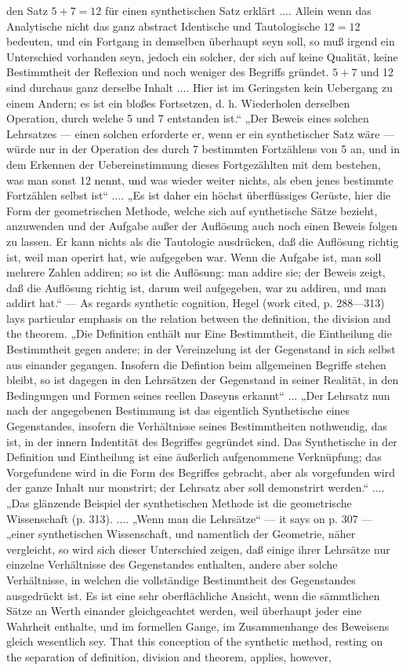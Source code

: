 \documentclass[12pt,a4paper,openany]{book}
\begin{document}
den Satz $5+7=12$ für einen synthetischen Satz erklärt .... Allein wenn das Analytische nicht das ganz abstract Identische und Tautologische $12=12$ bedeuten, und ein Fortgang in demselben überhaupt seyn soll, so muß irgend ein Unterschied vorhanden seyn, jedoch ein solcher, der sich auf keine Qualität, keine Bestimmtheit der Reflexion und noch weniger des Begriffs gründet. $5+7$ und 12 sind durchaus ganz derselbe Inhalt .... Hier ist im Geringsten kein Uebergang zu einem Andern; es ist ein bloßes Fortsetzen, d. h. Wiederholen derselben Operation, durch welche 5 und 7 entstanden ist.“ „Der Beweis eines solchen Lehrsatzes — einen solchen erforderte er, wenn er ein synthetischer Satz wäre — würde nur in der Operation des durch 7 bestimmten Fortzählens von 5 an, und in dem Erkennen der Uebereinstimmung dieses Fortgezählten mit dem bestehen, was man sonst 12 nennt, und was wieder weiter nichts, als eben jenes bestimmte Fortzählen selbst ist“ .... „Es ist daher ein höchst überflüssiges Gerüste, hier die Form der geometrischen Methode, welche sich auf synthetische Sätze bezieht, anzuwenden und der Aufgabe außer der Auflösung auch noch einen Beweis folgen zu lassen. Er kann nichts als die Tautologie ausdrücken, daß die Auflösung richtig ist, weil man operirt hat, wie aufgegeben war. Wenn die Aufgabe ist, man soll mehrere Zahlen addiren; so ist die Auflösung: man addire sie; der Beweis zeigt, daß die Auflösung richtig ist, darum weil aufgegeben, war zu addiren, und man addirt hat.“ — As regards synthetic cognition, Hegel (work cited, p. 288—313) lays particular emphasis on the relation between the definition, the division and the theorem. „Die Definition enthält nur Eine Bestimmtheit, die Eintheilung die Bestimmtheit gegen andere; in der Vereinzelung ist der Gegenstand in sich selbst aus einander gegangen. Insofern die Defintion beim allgemeinen Begriffe stehen bleibt, so ist dagegen in den Lehrsätzen der Gegenstand in seiner Realität, in den Bedingungen und Formen seines reellen Daseyns erkannt“ ... „Der Lehrsatz nun nach der angegebenen Bestimmung ist das eigentlich Synthetische eines Gegenstandes, insofern die Verhältnisse seines Bestimmtheiten nothwendig, das ist, in der innern Indentität des Begriffes gegründet sind. Das Synthetische in der Definition und Eintheilung ist eine äußerlich aufgenommene Verknüpfung; das Vorgefundene wird in die Form des Begriffes gebracht, aber als vorgefunden wird der ganze Inhalt nur monstrirt; der Lehrsatz aber soll demonstrirt werden.“ .... „Das glänzende Beispiel der synthetischen Methode ist die geometrische Wissenschaft (p. 313). .... „Wenn man die Lehrsätze“ — it says on p. 307 — „einer synthetischen Wissenschaft, und namentlich der Geometrie, näher vergleicht, so wird sich dieser Unterschied zeigen, daß einige ihrer Lehrsätze nur einzelne Verhältnisse des Gegenstandes enthalten, andere aber solche Verhältnisse, in welchen die vollständige Bestimmtheit des Gegenstandes ausgedrückt ist. Es ist eine sehr oberflächliche Ansicht, wenn die sämmtlichen Sätze an Werth einander gleichgeachtet werden, weil überhaupt jeder eine Wahrheit enthalte, und im formellen Gange, im Zusammenhange des Beweisens gleich wesentlich sey. That this conception of the synthetic method, resting on the separation of definition, division and theorem, applies, however, 
\end{document}

